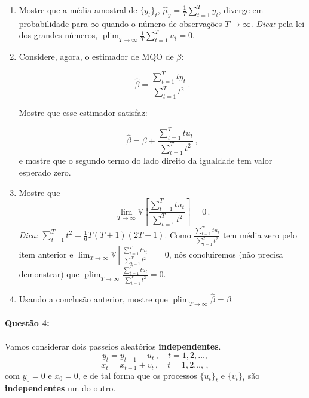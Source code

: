 \documentclass[10pt,a4paper]{article}
\begin{document}
		\begin{enumerate}
			\item Mostre que a média amostral de $\{y_t\}_t$, $\hat{\mu}_y = \frac{1}{T}\sum_{t=1}^T y_t$, diverge em probabilidade para $\infty$ quando o número de observações $T \to \infty$. \textit{Dica:} pela lei dos grandes números, $\operatorname{plim}_{T \to \infty}\frac{1}{T}\sum_{t=1}^T u_t  = 0$.
			\item Considere, agora, o estimador de MQO de $\beta$:
			
			$$\hat{\beta} = \frac{\sum_{t=1}^T t y_t}{\sum_{t=1}^T t^2}\, .$$
			
			Mostre que esse estimador satisfaz:
			
			$$\hat{\beta} = \beta +  \frac{\sum_{t=1}^T t u_t }{\sum_{t=1}^T t^2} \, ,$$
			e mostre que o segundo termo do lado direito da igualdade tem valor esperado zero.
			\item Mostre que 
			$$\lim_{T \to \infty}\mathbb{V}\left[ \frac{\sum_{t=1}^T t u_t }{\sum_{t=1}^T t^2}\right] = 0\, .$$
			\textit{Dica:} $\sum_{t=1}^T t^2 =\frac{1}{6} T(T+1)(2T+1)$. Como $\frac{\sum_{t=1}^T t u_t }{\sum_{t=1}^T t^2}$ tem média zero pelo item anterior e $\lim_{T \to \infty}\mathbb{V}\left[ \frac{\sum_{t=1}^T t u_t }{\sum_{t=1}^T t^2}\right] = 0$, nós concluiremos (não precisa demonstrar) que $\operatorname{plim}_{T\to \infty} \frac{\sum_{t=1}^T t u_t }{\sum_{t=1}^T t^2} = 0$. 
			
			\item Usando a conclusão anterior, mostre que $\operatorname{plim}_{T\to \infty} \hat{\beta} = \beta$.
			
		\end{enumerate} 
		
			\paragraph{Questão 4:} Vamos considerar dois passeios aleatórios \textbf{independentes}.
			$$y_t = y_{t-1} + u_t \, ,\quad  t=1,2,\ldots, $$
						$$x_t = x_{t-1} + v_t \, ,\quad  t=1,2\ldots, \, , $$
			com $y_0 = 0$ e $x_0 = 0$, e de tal forma que os processos $\{u_t\}_t$ e $\{v_t\}_t$ são \textbf{independentes} um do outro.
			
\end{document}
